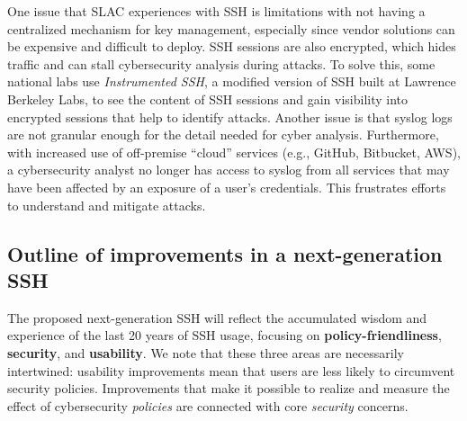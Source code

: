 \documentclass[10pt]{article}
\begin{document}
One issue that SLAC experiences with SSH is limitations with not
having a centralized mechanism for key management, especially since
vendor solutions can be expensive and difficult to deploy. SSH
sessions are also encrypted, which hides traffic and can stall
cybersecurity analysis during attacks. To solve this, some national
labs use \emph{Instrumented SSH}, a modified version of SSH built at
Lawrence Berkeley Labs, to see the content of SSH sessions and gain
visibility into encrypted sessions that help to identify
attacks. Another issue is that syslog logs are not granular enough for
the detail needed for cyber analysis. Furthermore, with increased use
of off-premise ``cloud'' services (e.g., GitHub, Bitbucket, AWS), a
cybersecurity analyst no longer has access to syslog from all services
that may have been affected by an exposure of a user's credentials.
This frustrates efforts to understand and mitigate attacks.

\subsection{Outline of improvements in a next-generation SSH}
\label{ss:outline}
The proposed next-generation SSH will reflect the accumulated wisdom
and experience of the last 20 years of SSH usage, focusing on
\textbf{policy-friendliness}, \textbf{security}, and
\textbf{usability}. We note that these three areas are necessarily
intertwined: usability improvements mean that users are less likely to
circumvent security policies. Improvements that make it possible to
realize and measure the effect of cybersecurity \emph{policies} are
connected with core \emph{security} concerns.
\end{document}
